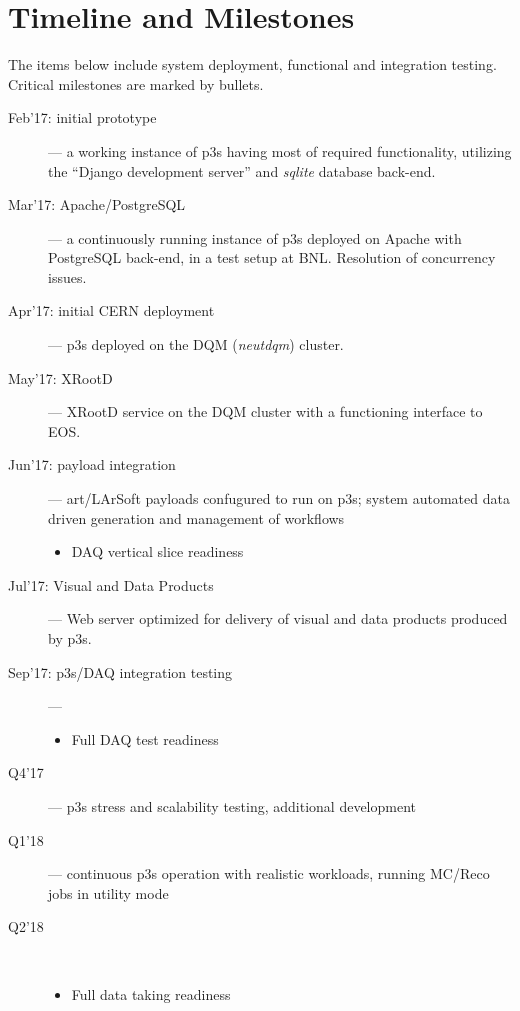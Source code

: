 \documentclass[pdftex,12pt,letter]{article}
\begin{document}
\section{Timeline and Milestones}
\label{sec:timeline}
The items below include system deployment, functional and integration testing.
Critical milestones are marked by bullets.

\begin{description}

\item[Feb'17: initial prototype] --- a working instance of p3s having most of
required functionality, utilizing the ``Django development server'' and \textit{sqlite}
database back-end.

\item[Mar'17: Apache/PostgreSQL] --- a continuously running instance of
p3s deployed on Apache with PostgreSQL back-end, in a test setup at BNL.
Resolution of concurrency issues.

\item[Apr'17: initial CERN deployment] --- p3s deployed on the DQM (\textit{neutdqm}) cluster.

\item[May'17: XRootD] --- XRootD service on the DQM cluster with
a functioning interface to EOS.

\item[Jun'17: payload integration] --- art/LArSoft payloads confugured to run on p3s; system
 automated data driven generation and management of workflows
\begin{itemize}
\item DAQ vertical slice readiness
\end{itemize}

\item[Jul'17: Visual and Data Products] --- Web server optimized
for delivery of visual and data products produced by p3s.


\item[Sep'17: p3s/DAQ integration testing] --- 
\begin{itemize}
\item Full DAQ test readiness
\end{itemize}

\item[Q4'17] --- p3s stress and scalability testing, additional development

\item[Q1'18] --- continuous p3s operation with realistic workloads, running
MC/Reco jobs in utility mode

\item[Q2'18]\ 
\begin{itemize}
\item Full data taking readiness
\end{itemize}

\end{description}
\end{document}

